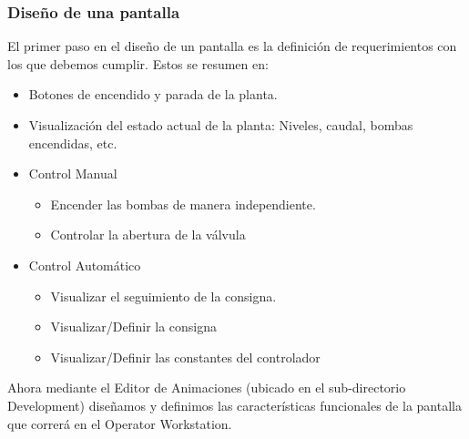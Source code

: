 \subsubsection{Diseño de una pantalla}
El primer paso en el diseño de un pantalla es la definición de requerimientos 
con los que debemos cumplir. Estos se resumen en:
\begin{itemize}
 \item Botones de encendido y parada de la planta.
 \item Visualización del estado actual de la planta: Niveles, caudal, bombas 
 encendidas, etc.
 \item Control Manual
 \begin{itemize}
  \item Encender las bombas de manera independiente.
  \item Controlar la abertura de la válvula
 \end{itemize}
 \item Control Automático
 \begin{itemize}
  \item Visualizar el seguimiento de la consigna.
  \item Visualizar/Definir la consigna
  \item Visualizar/Definir las constantes del controlador
 \end{itemize}
\end{itemize}

Ahora mediante el Editor de Animaciones (ubicado en el sub-directorio 
Development) diseñamos y definimos las características funcionales de 
la pantalla que correrá en el Operator Workstation. 


